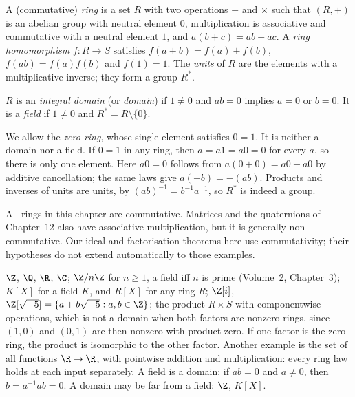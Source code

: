 \begin{definition}
A (commutative) \emph{ring} is a set $R$ with two operations $+$ and $\times$ such that $(R,+)$ is an abelian group with neutral element $0$, multiplication is associative and commutative with a neutral element $1$, and $a(b+c)=ab+ac$. A \emph{ring homomorphism} $f:R\to S$ satisfies $f(a+b)=f(a)+f(b)$, $f(ab)=f(a)f(b)$ and $f(1)=1$. The \emph{units} of $R$ are the elements with a multiplicative inverse; they form a group $R^*$.

$R$ is an \emph{integral domain} (or \emph{domain}) if $1\ne0$ and $ab=0$ implies $a=0$ or $b=0$. It is a \emph{field} if $1\ne0$ and $R^*=R\setminus\{0\}$.
\end{definition}

We allow the \emph{zero ring}, whose single element satisfies $0=1$.
It is neither a domain nor a field. If $0=1$ in any ring, then
$a=a1=a0=0$ for every $a$, so there is only one element. Here
$a0=0$ follows from $a(0+0)=a0+a0$ by additive cancellation;
the same laws give $a(-b)=-(ab)$. Products and inverses of units
are units, by $(ab)^{-1}=b^{-1}a^{-1}$, so $R^*$ is indeed a group.

All rings in this chapter are commutative. Matrices and the quaternions of Chapter~12 also have associative multiplication, but it is generally non-commutative. Our ideal and factorisation theorems here use commutativity; their hypotheses do not extend automatically to those examples.

\begin{example}\label{ex:rings}
$\Z$, $\Q$, $\R$, $\C$; $\Z/n\Z$ for $n\ge1$, a field iff $n$ is prime (Volume~2, Chapter~3); $K[X]$ for a field $K$, and $R[X]$ for any ring $R$; $\Z[i]$, $\Z[\sqrt{-5}]=\{a+b\sqrt{-5}:a,b\in\Z\}$; the product $R\times S$ with componentwise operations, which is not a domain when both factors are nonzero rings, since $(1,0)$ and $(0,1)$ are then nonzero with product zero. If one factor is the zero ring, the product is isomorphic to the other factor. Another example is the set of all functions $\R\to\R$, with pointwise addition and multiplication: every ring law holds at each input separately. A field is a domain: if $ab=0$ and $a\ne0$, then $b=a^{-1}ab=0$. A domain may be far from a field: $\Z$, $K[X]$.
\end{example}

